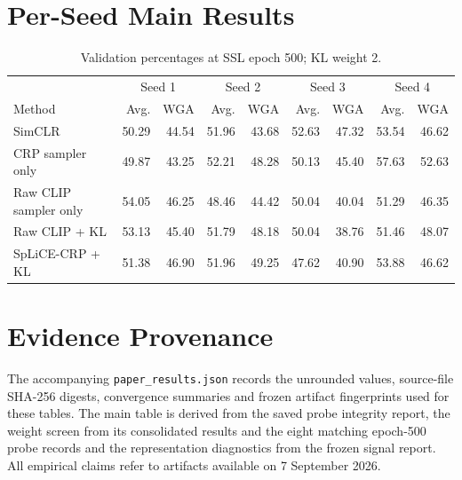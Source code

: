 \documentclass[11pt,a4paper]{article}
\begin{document}
\section{Per-Seed Main Results}
\begin{table}[ht]
\centering\small
\caption{Validation percentages at SSL epoch 500; KL weight 2.}
\begin{tabular}{lrrrrrrrr}
\toprule
& \multicolumn{2}{c}{Seed 1} & \multicolumn{2}{c}{Seed 2} & \multicolumn{2}{c}{Seed 3} & \multicolumn{2}{c}{Seed 4} \\
Method & Avg. & WGA & Avg. & WGA & Avg. & WGA & Avg. & WGA \\
\midrule
SimCLR & 50.29 & 44.54 & 51.96 & 43.68 & 52.63 & 47.32 & 53.54 & 46.62 \\
CRP sampler only & 49.87 & 43.25 & 52.21 & 48.28 & 50.13 & 45.40 & 57.63 & 52.63 \\
Raw CLIP sampler only & 54.05 & 46.25 & 48.46 & 44.42 & 50.04 & 40.04 & 51.29 & 46.35 \\
Raw CLIP + KL & 53.13 & 45.40 & 51.79 & 48.18 & 50.04 & 38.76 & 51.46 & 48.07 \\
SpLiCE-CRP + KL & 51.38 & 46.90 & 51.96 & 49.25 & 47.62 & 40.90 & 53.88 & 46.62 \\
\bottomrule
\end{tabular}
\end{table}

\section{Evidence Provenance}
The accompanying \texttt{paper\_results.json} records the unrounded values,
source-file SHA-256 digests, convergence summaries and frozen artifact
fingerprints used for these tables. The main table is derived from the saved
probe integrity report, the weight screen from its consolidated results and
the eight matching epoch-500 probe records and the representation diagnostics
from the frozen signal report. All empirical claims refer to artifacts available
on 7 September 2026.
\end{document}
